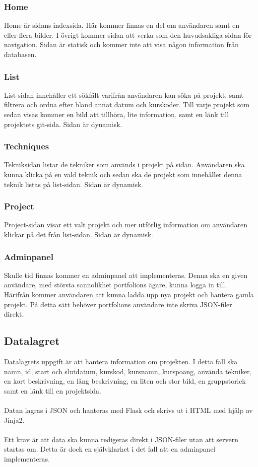\documentclass{TDP003mall}
\begin{document}
\subsubsection{Home}
Home är sidans indexsida. Här kommer finnas en del om användaren samt en eller flera bilder.
I övrigt kommer sidan att verka som den huvudsakliga sidan för navigation. Sidan är 
statisk och kommer inte att visa någon information från databasen.

\subsubsection{List}
List-sidan innehåller ett sökfält varifrån användaren kan söka på projekt, samt filtrera
och ordna efter bland annat datum och kurskoder. Till varje projekt som sedan 
visas kommer en bild att tillhöra, lite information, samt en länk till projektets git-sida.
Sidan är dynamisk.

\subsubsection{Techniques}
Tekniksidan listar de tekniker som används i projekt på sidan. Användaren ska kunna
klicka på en vald teknik och sedan ska de projekt som innehåller denna teknik listas
på list-sidan. Sidan är dynamisk.

\subsubsection{Project}
Project-sidan visar ett valt projekt och mer utförlig information om användaren
klickar på det från list-sidan. Sidan är dynamisk.

\subsubsection{Adminpanel}
Skulle tid finnas kommer en adminpanel att implementeras. Denna ska en given användare,
med största sannolikhet portfolions ägare, kunna logga in till. Härifrån kommer
användaren att kunna ladda upp nya projekt och hantera gamla projekt. På detta
sätt behöver portfolions användare inte skriva JSON-filer direkt. 

\subsection{Datalagret}
Datalagrets uppgift är att hantera information om projekten. I detta fall ska
namn, id, start och slutdatum, kurskod, kursnamn, kurspoäng, använda tekniker,
en kort beskrivning, en lång beskrivning, en liten och stor bild, en gruppstorlek
samt en länk till en projektsida.\\\\
Datan lagras i JSON och hanteras med Flask och skrivs ut i HTML med hjälp av Jinja2.\\\\
Ett krav är att data ska kunna redigeras direkt i JSON-filer utan att servern startas om.
Detta är dock en självklarhet i det fall att en adminpanel implementeras.
\end{document}
